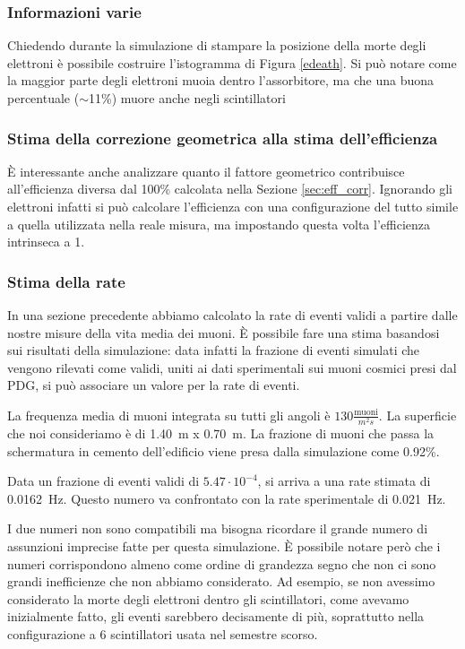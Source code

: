 \subsubsection{Informazioni varie}
Chiedendo durante la simulazione di stampare la posizione della morte degli elettroni \`e possibile costruire l'istogramma di Figura \ref{edeath}. Si pu\`o notare come la maggior parte degli elettroni muoia dentro l'assorbitore, ma che una buona percentuale ($\sim$11\%) muore anche negli scintillatori


\subsubsection{Stima della correzione geometrica alla stima dell'efficienza}
\`E interessante anche analizzare quanto il fattore geometrico contribuisce all'efficienza diversa dal 100\% calcolata nella Sezione \ref{sec:eff_corr}. Ignorando gli elettroni infatti si pu\`o calcolare l'efficienza con una configurazione del tutto simile a quella utilizzata nella reale misura, ma impostando questa volta l'efficienza intrinseca a 1.

\subsubsection{Stima della rate}
In una sezione precedente abbiamo calcolato la rate di eventi validi a partire dalle nostre misure della vita media dei muoni. 
\`E possibile fare una stima basandosi sui risultati della simulazione: data infatti la frazione di eventi simulati che vengono rilevati come validi, uniti ai dati sperimentali sui muoni cosmici presi dal PDG, si pu\`o associare un valore per la rate di eventi.

La frequenza media di muoni integrata su tutti gli angoli \`e $130 \frac{\mathrm{muoni}}{m^2 s}$. La superficie che noi consideriamo \`e di 1.40~m x 0.70~m. 
La frazione di muoni che passa la schermatura in cemento dell'edificio viene presa dalla simulazione come 0.92\%.

Data un frazione di eventi validi di $5.47\cdot 10^{-4}$, si arriva a una rate stimata di 0.0162~Hz. 
Questo numero va confrontato con la rate sperimentale di 0.021~Hz.

I due numeri non sono compatibili ma bisogna ricordare il grande numero di assunzioni imprecise fatte per questa simulazione. 
\`E possibile notare per\`o che i numeri corrispondono almeno come ordine di grandezza segno che non ci sono grandi inefficienze che non abbiamo considerato. 
Ad esempio, se non avessimo considerato la morte degli elettroni dentro gli scintillatori, come avevamo inizialmente fatto, gli eventi sarebbero decisamente di pi\`u, soprattutto nella configurazione a 6 scintillatori usata nel semestre scorso.

